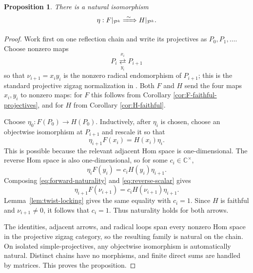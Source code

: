 \documentclass[12pt,leqno]{amsart}
\numberwithin{equation}{section}
\newtheorem{prop}[thm]{Proposition}
\def\C{\mathbb{C}}
\begin{document}
\begin{prop}\label{prop:natural-on-projectives}
There is a natural isomorphism
\[
 \eta:F|_{\mathcal P^k}\xRightarrow{\ \sim\ }
 H|_{\mathcal P^k}.
\]
\end{prop}

\begin{proof}
Work first on one reflection chain and write its projectives as
$P_0,P_1,\ldots$.  Choose nonzero maps
\[
 P_i\underset{y_i}{\stackrel{x_i}{\rightleftarrows}}P_{i+1}
\]
so that $\nu_{i+1}=x_iy_i$ is the nonzero radical endomorphism of
$P_{i+1}$; this is the standard projective zigzag normalization in
\cite[Sections~4 and 6]{McRaeYang}.  Both $F$ and $H$ send the four maps
$x_i,y_i$ to nonzero maps: for $F$ this follows from Corollary
\ref{cor:F-faithful-projectives}, and for $H$ from Corollary
\ref{cor:H-faithful}.

Choose $\eta_0:F(P_0)\to H(P_0)$.  Inductively, after $\eta_i$ is chosen,
choose an objectwise isomorphism at $P_{i+1}$ and rescale it so that
\begin{equation}\label{eq:forward-naturality}
 \eta_{i+1}F(x_i)=H(x_i)\eta_i.
\end{equation}
This is possible because the relevant adjacent Hom space is
one-dimensional.  The reverse Hom space is also one-dimensional, so for
some $c_i\in\C^\times$,
\begin{equation}\label{eq:reverse-scalar}
 \eta_iF(y_i)=c_iH(y_i)\eta_{i+1}.
\end{equation}
Composing \eqref{eq:forward-naturality} and
\eqref{eq:reverse-scalar} gives
\[
 \eta_{i+1}F(\nu_{i+1})
 =c_iH(\nu_{i+1})\eta_{i+1}.
\]
Lemma~\ref{lem:twist-locking} gives the same equality with $c_i=1$.
Since $H$ is faithful and $\nu_{i+1}\neq0$, it follows that $c_i=1$.
Thus naturality holds for both arrows.

The identities, adjacent arrows, and radical loops span every nonzero Hom
space in the projective zigzag category, so the resulting family is natural
on the chain.  On isolated simple-projectives, any objectwise isomorphism is
automatically natural.  Distinct chains have no morphisms, and finite direct
sums are handled by matrices.  This proves the proposition.
\end{proof}
\end{document}
